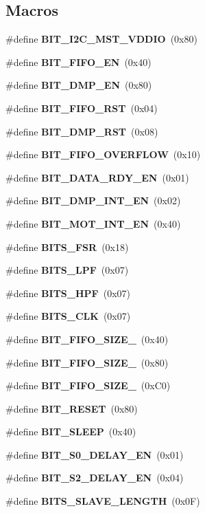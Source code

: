 \subsection*{Macros}
\begin{DoxyCompactItemize}
\item 
\#define \textbf{ B\+I\+T\+\_\+\+I2\+C\+\_\+\+M\+S\+T\+\_\+\+V\+D\+D\+IO}~(0x80)
\item 
\#define \textbf{ B\+I\+T\+\_\+\+F\+I\+F\+O\+\_\+\+EN}~(0x40)
\item 
\#define \textbf{ B\+I\+T\+\_\+\+D\+M\+P\+\_\+\+EN}~(0x80)
\item 
\#define \textbf{ B\+I\+T\+\_\+\+F\+I\+F\+O\+\_\+\+R\+ST}~(0x04)
\item 
\#define \textbf{ B\+I\+T\+\_\+\+D\+M\+P\+\_\+\+R\+ST}~(0x08)
\item 
\#define \textbf{ B\+I\+T\+\_\+\+F\+I\+F\+O\+\_\+\+O\+V\+E\+R\+F\+L\+OW}~(0x10)
\item 
\#define \textbf{ B\+I\+T\+\_\+\+D\+A\+T\+A\+\_\+\+R\+D\+Y\+\_\+\+EN}~(0x01)
\item 
\#define \textbf{ B\+I\+T\+\_\+\+D\+M\+P\+\_\+\+I\+N\+T\+\_\+\+EN}~(0x02)
\item 
\#define \textbf{ B\+I\+T\+\_\+\+M\+O\+T\+\_\+\+I\+N\+T\+\_\+\+EN}~(0x40)
\item 
\#define \textbf{ B\+I\+T\+S\+\_\+\+F\+SR}~(0x18)
\item 
\#define \textbf{ B\+I\+T\+S\+\_\+\+L\+PF}~(0x07)
\item 
\#define \textbf{ B\+I\+T\+S\+\_\+\+H\+PF}~(0x07)
\item 
\#define \textbf{ B\+I\+T\+S\+\_\+\+C\+LK}~(0x07)
\item 
\#define \textbf{ B\+I\+T\+\_\+\+F\+I\+F\+O\+\_\+\+S\+I\+Z\+E\+\_}~(0x40)
\item 
\#define \textbf{ B\+I\+T\+\_\+\+F\+I\+F\+O\+\_\+\+S\+I\+Z\+E\+\_}~(0x80)
\item 
\#define \textbf{ B\+I\+T\+\_\+\+F\+I\+F\+O\+\_\+\+S\+I\+Z\+E\+\_}~(0x\+C0)
\item 
\#define \textbf{ B\+I\+T\+\_\+\+R\+E\+S\+ET}~(0x80)
\item 
\#define \textbf{ B\+I\+T\+\_\+\+S\+L\+E\+EP}~(0x40)
\item 
\#define \textbf{ B\+I\+T\+\_\+\+S0\+\_\+\+D\+E\+L\+A\+Y\+\_\+\+EN}~(0x01)
\item 
\#define \textbf{ B\+I\+T\+\_\+\+S2\+\_\+\+D\+E\+L\+A\+Y\+\_\+\+EN}~(0x04)
\item 
\#define \textbf{ B\+I\+T\+S\+\_\+\+S\+L\+A\+V\+E\+\_\+\+L\+E\+N\+G\+TH}~(0x0\+F)

\end{DoxyCompactItemize}
